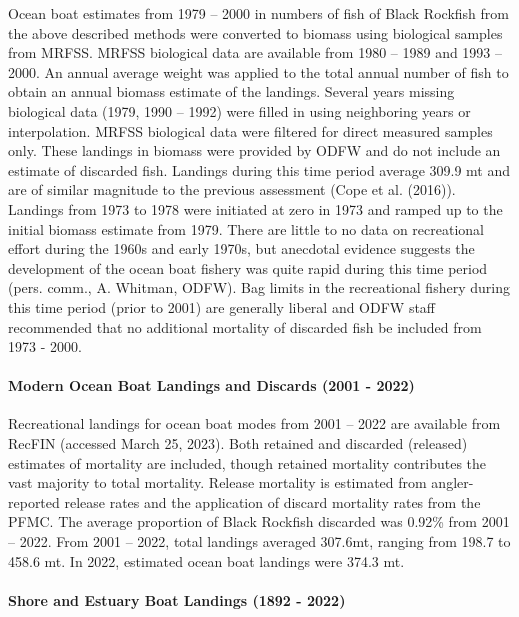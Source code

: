 \documentclass[11pt,
  english,
  letterpaper,
]{article}
\begin{document}
Ocean boat estimates from 1979 -- 2000 in numbers of fish of Black Rockfish from the above described methods were converted to biomass using biological samples from MRFSS. MRFSS biological data are available from 1980 -- 1989 and 1993 -- 2000. An annual average weight was applied to the total annual number of fish to obtain an annual biomass estimate of the landings. Several years missing biological data (1979, 1990 -- 1992) were filled in using neighboring years or interpolation. MRFSS biological data were filtered for direct measured samples only. These landings in biomass were provided by ODFW and do not include an estimate of discarded fish. Landings during this time period average 309.9 mt and are of similar magnitude to the previous assessment (Cope et al. (2016)). Landings from 1973 to 1978 were initiated at zero in 1973 and ramped up to the initial biomass estimate from 1979. There are little to no data on recreational effort during the 1960s and early 1970s, but anecdotal evidence suggests the development of the ocean boat fishery was quite rapid during this time period (pers. comm., A. Whitman, ODFW). Bag limits in the recreational fishery during this time period (prior to 2001) are generally liberal and ODFW staff recommended that no additional mortality of discarded fish be included from 1973 - 2000.

\hypertarget{modern-ocean-boat-landings-and-discards-2001---2022}{%
\paragraph{Modern Ocean Boat Landings and Discards (2001 - 2022)}\label{modern-ocean-boat-landings-and-discards-2001---2022}}

Recreational landings for ocean boat modes from 2001 -- 2022 are available from RecFIN (accessed March 25, 2023). Both retained and discarded (released) estimates of mortality are included, though retained mortality contributes the vast majority to total mortality. Release mortality is estimated from angler-reported release rates and the application of discard mortality rates from the PFMC. The average proportion of Black Rockfish discarded was 0.92\% from 2001 -- 2022. From 2001 -- 2022, total landings averaged 307.6mt, ranging from 198.7 to 458.6 mt. In 2022, estimated ocean boat landings were 374.3 mt.

\hypertarget{shore-and-estuary-boat-landings-1892---2022}{%
\paragraph{Shore and Estuary Boat Landings (1892 - 2022)}\label{shore-and-estuary-boat-landings-1892---2022}}
\end{document}
